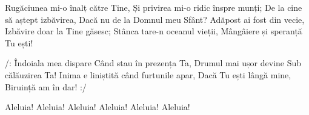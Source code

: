 \beginverse
Rugăciunea mi-o înalț către Tine,
Și privirea mi-o ridic înspre munți;
De la cine să aștept izbăvirea,
Dacă nu de la Domnul meu Sfânt?
Adăpost ai fost din vecie,
Izbăvire doar la Tine găsesc;
Stânca tare-n oceanul vieții,
Mângâiere și speranță Tu ești!
\endverse

\beginchorus
/: Îndoiala mea dispare
Când stau în prezența Ta,
Drumul mai ușor devine
Sub călăuzirea Ta!
Inima e liniștită când furtunile apar,
Dacă Tu ești lângă mine,
Biruință am în dar! :/
\endchorus

\beginverse*
Aleluia! Aleluia! Aleluia!
Aleluia! Aleluia! Aleluia!
\endverse
\endsong